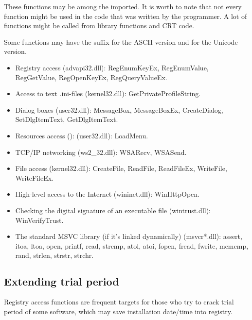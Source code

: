 These functions may be among the imported.
It is worth to note that not every function might be used in the code that was written by the programmer.
A lot of functions might be called from library functions and \ac{CRT} code.

Some functions may have the  suffix for the ASCII version and  for the Unicode version.

\begin{itemize}

\item
Registry access (advapi32.dll): 
RegEnumKeyEx, RegEnumValue, RegGetValue, RegOpenKeyEx, RegQueryValueEx.

\item
Access to text .ini-files (kernel32.dll): 
GetPrivateProfileString.

\item
Dialog boxes (user32.dll): 
MessageBox, MessageBoxEx, CreateDialog, SetDlgItemText, GetDlgItemText.

\item
Resources access (): (user32.dll): LoadMenu.

\item
TCP/IP networking (ws2\_32.dll):
WSARecv, WSASend.

\item
File access (kernel32.dll):
CreateFile, ReadFile, ReadFileEx, WriteFile, WriteFileEx.

\item
High-level access to the Internet (wininet.dll): WinHttpOpen.

\item
Checking the digital signature of an executable file (wintrust.dll):
WinVerifyTrust.

\item
The standard MSVC library (if it's linked dynamically) (msvcr*.dll):
assert, itoa, ltoa, open, printf, read, strcmp, atol, atoi, fopen, fread, fwrite, memcmp, rand,
strlen, strstr, strchr.

\end{itemize}

\subsection{Extending trial period}

Registry access functions are frequent targets for those who try to crack trial period of some software, which may save
installation date/time into registry.

